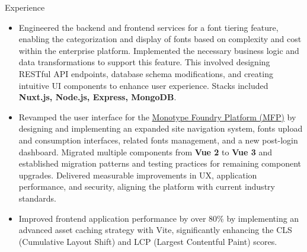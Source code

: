 \documentclass{resume} %
\begin{document}
\begin{rSection}{Experience}
\begin{itemize}
    \item Engineered the backend and frontend services for a font tiering feature, enabling the categorization and display of fonts based on complexity and cost within the enterprise platform. Implemented the necessary business logic and data transformations to support this feature. This involved designing RESTful API endpoints, database schema modifications, and creating intuitive UI components to enhance user experience. Stacks included \textbf{Nuxt.js, Node.js, Express, MongoDB}.
    \item Revamped the user interface for the \href{https://fontplatform.monotype.com/}{Monotype Foundry Platform (MFP)} by designing and implementing an expanded site navigation system, fonts upload and consumption interfaces, related fonts management, and a new post-login dashboard. Migrated multiple components from \textbf{Vue 2} to \textbf{Vue 3} and established migration patterns and testing practices for remaining component upgrades. Delivered measurable improvements in UX, application performance, and security, aligning the platform with current industry standards.
    \item Improved frontend application performance by over 80\% by implementing an advanced asset caching strategy with Vite, significantly enhancing the CLS (Cumulative Layout Shift) and LCP (Largest Contentful Paint) scores.
 \end{itemize}
 

\end{rSection}
\end{document}

